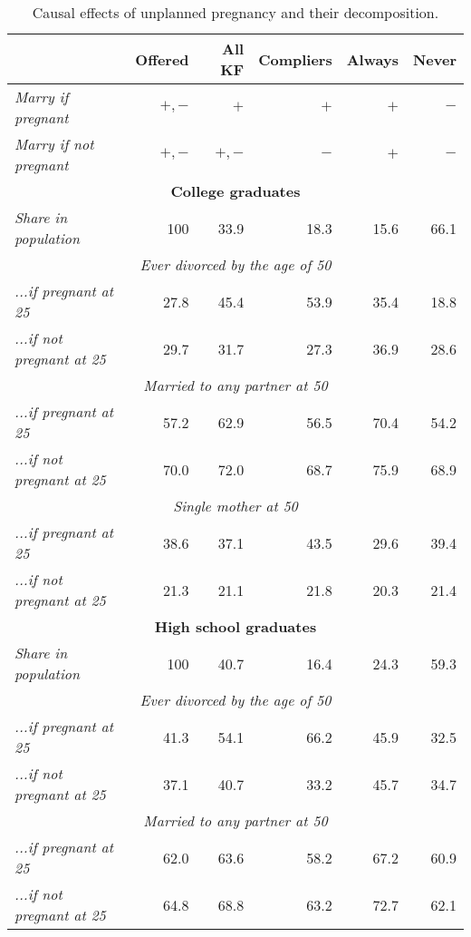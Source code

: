 \documentclass[12pt,letter]{article}
\begin{document}
\begin{table}[h]
\caption{Causal effects of unplanned pregnancy and their decomposition.\label{causal-table}}
\begin{center}
\begin{tabular}{l r r r r r}
\hline\hline
& \textbf{Offered} & \textbf{All KF} & \textbf{Compliers} & \textbf{Always} & \textbf{Never} \\\hline
\textit{Marry if pregnant} & $+,-$ & $+$ & $+$ & $+$ & $-$ \\
\textit{Marry if not pregnant} &  $+,-$ & $+,-$ &  $-$  & $+$ & $-$ \\ \hline
\multicolumn{6}{c}{\textbf{College graduates}}\\\hline
\textit{Share in population}& 100 & 33.9 & 18.3 & 15.6 & 66.1\\\hline
\multicolumn{6}{c}{\textit{Ever divorced by the age of 50}} \\
\textit{...if pregnant at 25} & 27.8 & 45.4 & 53.9 & 35.4 & 18.8\\
\textit{...if not pregnant at 25} & 29.7 & 31.7 & 27.3 & 36.9 & 28.6\\\hline
\multicolumn{6}{c}{\textit{Married to any partner at 50}} \\
\textit{...if pregnant at 25} & 57.2 & 62.9 & 56.5 & 70.4 & 54.2\\
\textit{...if not pregnant at 25} & 70.0 & 72.0 & 68.7 & 75.9 & 68.9\\\hline
\multicolumn{6}{c}{\textit{Single mother at 50}} \\
\textit{...if pregnant at 25} & 38.6 & 37.1 & 43.5 & 29.6 & 39.4\\
\textit{...if not pregnant at 25} & 21.3 & 21.1 & 21.8 & 20.3 & 21.4\\\hline
\multicolumn{6}{c}{\textbf{High school graduates}}\\\hline
\textit{Share in population}& 100 & 40.7 & 16.4 & 24.3 & 59.3\\\hline
\multicolumn{6}{c}{\textit{Ever divorced by the age of 50}} \\
\textit{...if pregnant at 25} & 41.3 & 54.1 & 66.2 & 45.9 & 32.5\\
\textit{...if not pregnant at 25} & 37.1 & 40.7 & 33.2 & 45.7 & 34.7\\\hline
\multicolumn{6}{c}{\textit{Married to any partner at 50}} \\
\textit{...if pregnant at 25} & 62.0 & 63.6 & 58.2 & 67.2 & 60.9\\
\textit{...if not pregnant at 25} & 64.8 & 68.8 & 63.2 & 72.7 & 62.1\\\hline

\end{tabular}
\end{center}
\end{table}
\end{document}
